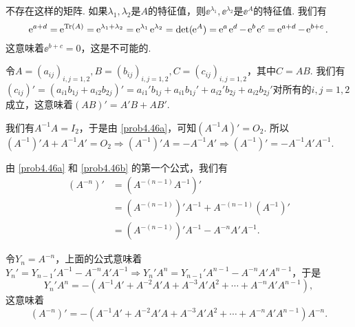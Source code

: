 \setcounter{solution}{44}

\begin{solution}
  不存在这样的矩阵. 如果$\lambda_1,\lambda_2$是$A$的特征值，则$\ee^{\lambda_1},\ee^{\lambda_2}$是$\ee^A$的特征值. 我们有
  \[
    \ee^{a+d} = \ee^{\Tr(A)} = \ee^{\lambda_1+\lambda_2} = \ee^{\lambda_1}\ee^{\lambda_2} = \det(\ee^A) = \ee^a\ee^d - \ee^b\ee^c = \ee^{a+d} - \ee^{b+c}.
  \]
  这意味着$\ee^{b+c}=0$，这是不可能的.
\end{solution}

\begin{solution}
  \begin{inparaenum}[(a)]
    \item 令$A=(a_{ij})_{i,j=1,2},B=(b_{ij})_{i,j=1,2},C
        =(c_{ij})_{i,j=1,2}$，其中$C=AB$. 我们有$(c_{ij})'=(a_{i1}b_{1j}+a_{i2}b_{2j})'=
        a_{i1}'b_{1j}+a_{i1}b_{1j}'+a_{i2}'b_{2j}
        +a_{i2}b_{2j}'$对所有的$i,j=1,2$成立，这意味着$(AB)'=A'B+AB'$.

    \item 我们有$A^{-1}A=I_2$，于是由 \ref{prob4.46a}，可知$(A^{-1}A)'=O_2$. 所以$(A^{-1})'A+A^{-1}A'=O_2\Rightarrow (A^{-1})'A=-A^{-1}A'\Rightarrow (A^{-1})'=-A^{-1}A'A^{-1}$.

        由 \ref{prob4.46a} 和 \ref{prob4.46b} 的第一个公式，我们有
        \begin{align*}
          (A^{-n})' & = ( A^{-(n-1)} A^{-1} )' \\
          & = (A^{-(n-1)})'A^{-1} + A^{-(n-1)}(A^{-1})' \\
          & = (A^{-(n-1)})'A^{-1} - A^{-n}A'A^{-1} .
        \end{align*}

        令$Y_n=A^{-n}$，上面的公式意味着$Y_n'=Y_{n-1}'A^{-1}-A^{-n}A'A^{-1}\Rightarrow Y_n'A^n=Y_{n-1}'A^{n-1}-A^{-n}A'A^{n-1}$，于是
        \[
          Y_n'A^n = - \left( A^{-1}A' + A^{-2}A'A + A^{-3}A'A^2 + \cdots + A^{-n}A'A^{n-1} \right),
        \]
        这意味着
        \[
          (A^{-n})' = - \left( A^{-1}A' + A^{-2}A'A + A^{-3}A'A^2 + \cdots + A^{-n}A'A^{n-1} \right)A^{-n}.
        \]
  \end{inparaenum}
\end{solution}

